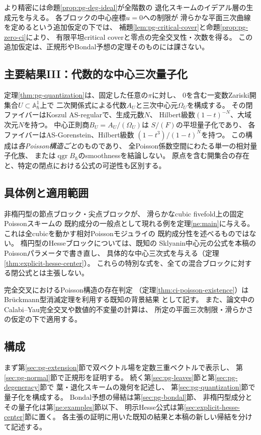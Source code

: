 より精密には命題\ref{prop:pg-deg-ideal}が全階数の
退化スキームのイデアル層の生成元を与える。
各ブロックの中心座標$u=0$への制限が
滑らかな平面三次曲線を定めるという追加仮定の下では、
補題\ref{lem:pg-critical-cover}と命題\ref{prop:pg-zero-ci}により、
有限平坦critical coverと零点の完全交叉性・次数を得る。
この追加仮定は、正規形やBondal予想の定理そのものには課さない。

\subsection*{主要結果III：代数的な中心三次量子化}
定理\ref{thm:pg-quantization}は、固定した任意の$\pi$に対し、
$0$を含む一変数Zariski開集合$U\subset\mathbb A^1_\hbar$上で
二次関係式による代数$A_U$と三次中心元$\Omega_U$を構成する。
その閉ファイバーはKoszul AS-regularで、生成元数$N$、
Hilbert級数$(1-t)^{-N}$、大域次元$N$を持つ。
中心正則商$B_U=A_U/(\Omega_U)$は
$S/(F)$の平坦量子化であり、
各ファイバーはAS-Gorenstein、Hilbert級数
$(1-t^3)/(1-t)^N$を持つ。
この構成は\emph{各Poisson構造ごと}のものであり、
全Poisson係数空間にわたる単一の相対量子化族、
または$\operatorname{qgr}B_\hbar$のsmoothnessを結論しない。
原点を含む開集合の存在と、特定の閉点における公式の可逆性も区別する。

\subsection*{具体例と適用範囲}
非楕円型の節点ブロック・尖点ブロックが、
滑らかなcubic fivefold上の固定Poissonスキームの
既約成分の一般点として現れる例を定理\ref{ne:main}に与える。
これは全cubicを動かす相対Poissonモジュライの
既約成分性を述べるものではない。
楕円型のHesseブロックについては、既知の
Sklyanin中心元の公式を本稿のPoissonパラメータで書き直し、
具体的な中心三次式を与える（定理\ref{thm:explicit-hesse-center}）。
これらの特別な式を、全ての混合ブロックに対する閉公式とは主張しない。

完全交叉におけるPoisson構造の存在判定
（定理\ref{thm:ci-poisson-existence}）は
Br\"uckmann型消滅定理を利用する既知の背景結果
\cite{FuHwangCI}として記す。
また、論文中のCalabi--Yau完全交叉や数値的不変量の計算は、
所定の平面三次制限・滑らかさの仮定の下で適用する。

\subsection*{構成}
まず第\ref{sec:pg-extension}節で双ベクトル場を定数三重ベクトルで表示し、
第\ref{sec:pg-normal}節で正規形を証明する。
続く第\ref{sec:pg-leaves}節と第\ref{sec:pg-degeneracy}節で
葉・退化スキームの幾何を記述し、
第\ref{sec:pg-quantization}節で量子化を構成する。
Bondal予想の帰結は第\ref{sec:pg-bondal}節、
非楕円型成分とその量子化は第\ref{ne:examples}節以下、
明示Hesse公式は第\ref{sec:explicit-hesse-center}節に置く。
各主張の証明に用いた既知の結果と本稿の新しい帰結を分けて記述する。









